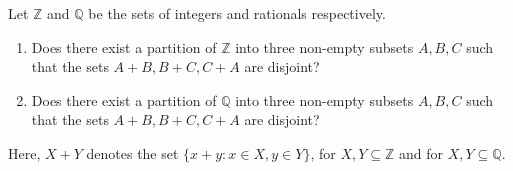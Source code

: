 Let $\mathbb{Z}$ and $\mathbb{Q}$ be the sets of integers and rationals respectively.

\begin{enumerate}[label = (\alph*)]
	\item Does there exist a partition of $\mathbb{Z}$ into three non-empty subsets $A,B,C$ such that the sets $A+B, B+C, C+A$ are disjoint?
	\item Does there exist a partition of $\mathbb{Q}$ into three non-empty subsets $A,B,C$ such that the sets $A+B, B+C, C+A$ are disjoint?
\end{enumerate}

Here, $X+Y$ denotes the set $\{ x+y : x \in X, y \in Y \}$, for $X,Y \subseteq \mathbb{Z}$ and for $X,Y \subseteq \mathbb{Q}$.
